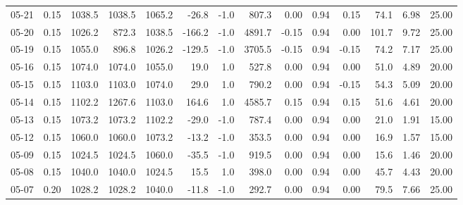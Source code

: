 \begin{threeparttable}
{\begin{tabular}{lrrrrrrrrrrrrr}
  05-21 &     0.15 & 1038.5 & 1038.5 & 1065.2 &      -26.8 &                     -1.0 &               807.3 &       0.00 &      0.94 &           0.15 &             74.1 &            6.98 &                  25.00 \\
  05-20 &     0.15 & 1026.2 &  872.3 & 1038.5 &     -166.2 &                     -1.0 &              4891.7 &      -0.15 &      0.94 &           0.00 &            101.7 &            9.72 &                  25.00 \\
  05-19 &     0.15 & 1055.0 &  896.8 & 1026.2 &     -129.5 &                     -1.0 &              3705.5 &      -0.15 &      0.94 &          -0.15 &             74.2 &            7.17 &                  25.00 \\
  05-16 &     0.15 & 1074.0 & 1074.0 & 1055.0 &       19.0 &                      1.0 &               527.8 &       0.00 &      0.94 &           0.00 &             51.0 &            4.89 &                  20.00 \\
  05-15 &     0.15 & 1103.0 & 1103.0 & 1074.0 &       29.0 &                      1.0 &               790.2 &       0.00 &      0.94 &          -0.15 &             54.3 &            5.09 &                  20.00 \\
  05-14 &     0.15 & 1102.2 & 1267.6 & 1103.0 &      164.6 &                      1.0 &              4585.7 &       0.15 &      0.94 &           0.15 &             51.6 &            4.61 &                  20.00 \\
  05-13 &     0.15 & 1073.2 & 1073.2 & 1102.2 &      -29.0 &                     -1.0 &               787.4 &       0.00 &      0.94 &           0.00 &             21.0 &            1.91 &                  15.00 \\
  05-12 &     0.15 & 1060.0 & 1060.0 & 1073.2 &      -13.2 &                     -1.0 &               353.5 &       0.00 &      0.94 &           0.00 &             16.9 &            1.57 &                  15.00 \\
  05-09 &     0.15 & 1024.5 & 1024.5 & 1060.0 &      -35.5 &                     -1.0 &               919.5 &       0.00 &      0.94 &           0.00 &             15.6 &            1.46 &                  20.00 \\
  05-08 &     0.15 & 1040.0 & 1040.0 & 1024.5 &       15.5 &                      1.0 &               398.0 &       0.00 &      0.94 &           0.00 &             45.7 &            4.43 &                  20.00 \\
  05-07 &     0.20 & 1028.2 & 1028.2 & 1040.0 &      -11.8 &                     -1.0 &               292.7 &       0.00 &      0.94 &           0.00 &             79.5 &            7.66 &                  25.00 \\

\end{tabular}}
\end{threeparttable}
